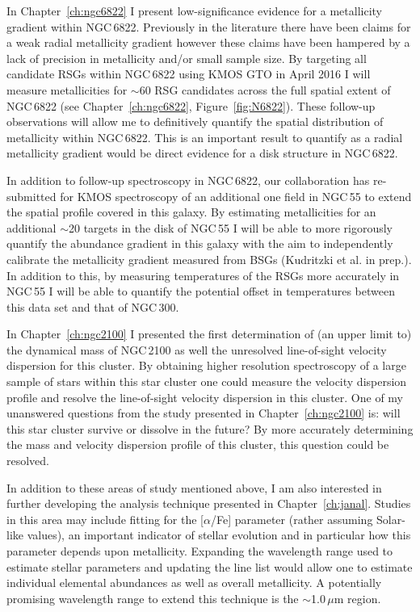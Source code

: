 In Chapter~\ref{ch:ngc6822} I present low-significance evidence for a metallicity gradient within NGC\,6822. Previously in the literature there have been claims for a weak radial metallicity gradient however these claims have been hampered by a lack of precision in metallicity and/or small sample size.
By targeting all candidate RSGs within NGC\,6822 using KMOS GTO in April 2016 I will measure metallicities for $\sim$60 RSG candidates across the full spatial extent of NGC\,6822 (see Chapter~\ref{ch:ngc6822}, Figure~\ref{fig:N6822}).
These follow-up observations will allow me to definitively quantify the spatial distribution of metallicity within NGC\,6822.
This is an important result to quantify as a radial metallicity gradient would be direct evidence for a disk structure in NGC\,6822.

In addition to follow-up spectroscopy in NGC\,6822, our collaboration has re-submitted for KMOS spectroscopy of an additional one field in NGC\,55 to extend the spatial profile covered in this galaxy.
By estimating metallicities for an additional $\sim$20 targets in the disk of NGC\,55 I will be able to more rigorously quantify the abundance gradient in this galaxy with the aim to independently calibrate the metallicity gradient measured from BSGs (Kudritzki et al. in prep.).
In addition to this, by measuring temperatures of the RSGs more accurately in NGC\,55 I will be able to quantify the potential offset in temperatures between this data set and that of NGC\,300.

In Chapter~\ref{ch:ngc2100} I presented the first determination of (an upper limit to) the dynamical mass of NGC\,2100 as well the unresolved line-of-sight velocity dispersion for this cluster.
By obtaining higher resolution spectroscopy of a large sample of stars within this star cluster one could measure the velocity dispersion profile and resolve the line-of-sight velocity dispersion in this cluster.
One of my unanswered questions from the study presented in Chapter~\ref{ch:ngc2100} is: will this star cluster survive or dissolve in the future?
By more accurately determining the mass and velocity dispersion profile of this cluster, this question could be resolved.


In addition to these areas of study mentioned above, I am also interested in further developing the analysis technique presented in Chapter~\ref{ch:janal}.
Studies in this area may include fitting for the [$\alpha$/Fe] parameter (rather assuming Solar-like values), an important indicator of stellar evolution and in particular how this parameter depends upon metallicity.
Expanding the wavelength range used to estimate stellar parameters and updating the line list would allow one to estimate individual elemental abundances as well as overall metallicity.
A potentially promising wavelength range to extend this technique is the $\sim$1.0\,$\mu$m region.

